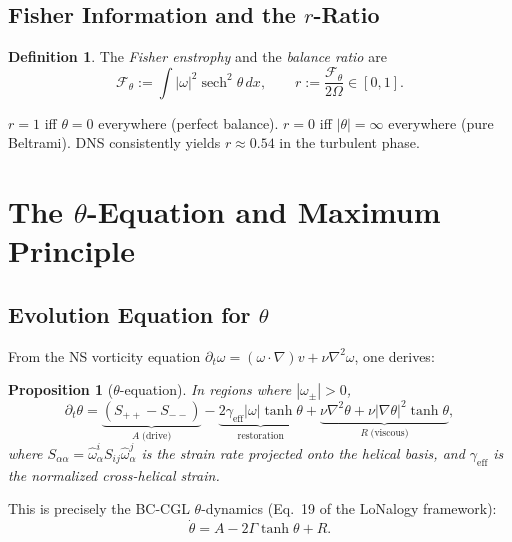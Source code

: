 \documentclass[12pt,a4paper]{article}
\newtheorem{proposition}[theorem]{Proposition}
\theoremstyle{definition}
\newtheorem{definition}[theorem]{Definition}
\newcommand{\sech}{\operatorname{sech}}
\newcommand{\F}{\mathcal{F}}
\begin{document}
\subsection{Fisher Information and the $r$-Ratio}

\begin{definition}
The \emph{Fisher enstrophy} and the \emph{balance ratio} are
\begin{equation}
  \F_\theta := \int |\omega|^2 \sech^2\theta\,dx, \qquad
  r := \frac{\F_\theta}{2\Omega} \in [0, 1].
\end{equation}
\end{definition}

$r = 1$ iff $\theta = 0$ everywhere (perfect balance). $r = 0$ iff $|\theta| = \infty$ everywhere (pure Beltrami). DNS consistently yields $r \approx 0.54$ in the turbulent phase.

\section{The $\theta$-Equation and Maximum Principle}\label{sec:theta}

\subsection{Evolution Equation for $\theta$}

From the NS vorticity equation $\partial_t\omega = (\omega\cdot\nabla)v + \nu\nabla^2\omega$, one derives:

\begin{proposition}[$\theta$-equation]\label{prop:theta_eq}
In regions where $|\omega_\pm| > 0$,
\begin{equation}\label{eq:theta_evolution}
  \partial_t\theta = \underbrace{(S_{++} - S_{--})}_{A\;\text{(drive)}}
    - \underbrace{2\gamma_{\mathrm{eff}}|\omega|\tanh\theta}_{\text{restoration}}
    + \underbrace{\nu\nabla^2\theta + \nu|\nabla\theta|^2\tanh\theta}_{R\;\text{(viscous)}},
\end{equation}
where $S_{\alpha\alpha} = \hat{\omega}_\alpha^i S_{ij} \hat{\omega}_\alpha^j$ is the strain rate projected onto the helical basis, and $\gamma_{\mathrm{eff}}$ is the normalized cross-helical strain.
\end{proposition}

This is precisely the BC-CGL $\theta$-dynamics (Eq.~19 of the LoNalogy framework):
\begin{equation}
  \dot{\theta} = A - 2\Gamma\tanh\theta + R.
\end{equation}
\end{document}
